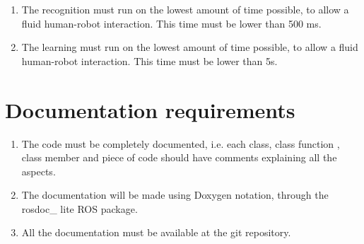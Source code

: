 \documentclass{article}
\makeatletter
\def\threedigits#1{\expandafter\@threedigits\csname c@#1\endcsname}
\def\@threedigits#1{%
  \ifnum#1<100 0\fi
  \ifnum#1<10 0\fi
  \number#1}
\makeatother
\begin{document}
\begin{center}
\begin{enumerate}[label=\textbf{PR\threedigits*}]
\item The recognition must run on the lowest amount of time possible, to allow a fluid human-robot interaction. This time must be lower than 500 ms. 
\item The learning must run on the lowest amount of time possible, to allow a fluid human-robot interaction. This time must be lower than 5s. 
\end{enumerate}



\section{Documentation requirements}
\begin{enumerate}[label=\textbf{DR\threedigits*}]
	\item The code must be completely documented, i.e. each class, class function , class member and piece of code should have comments explaining all the aspects. 
	\item The documentation will be made using Doxygen notation, through the rosdoc\_ lite 
	ROS package. 
	\item All the documentation must be available at the git repository. 
\end{enumerate}


\end{center}
\end{document}
